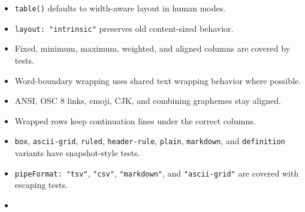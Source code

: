 \begin{itemize}
\tightlist
\item
  \texttt{t\allowbreak{}a\allowbreak{}b\allowbreak{}l\allowbreak{}e\allowbreak{}(\allowbreak{})} defaults to width-aware layout in human modes.
\item
  \texttt{l\allowbreak{}a\allowbreak{}y\allowbreak{}o\allowbreak{}u\allowbreak{}t\allowbreak{}:\allowbreak{} \allowbreak{}"\allowbreak{}i\allowbreak{}n\allowbreak{}t\allowbreak{}r\allowbreak{}i\allowbreak{}n\allowbreak{}s\allowbreak{}i\allowbreak{}c\allowbreak{}"} preserves old content-sized behavior.
\item
  Fixed, minimum, maximum, weighted, and aligned columns are covered by tests.
\item
  Word-boundary wrapping uses shared text wrapping behavior where possible.
\item
  ANSI, OSC 8 links, emoji, CJK, and combining graphemes stay aligned.
\item
  Wrapped rows keep continuation lines under the correct columns.
\item
  \texttt{b\allowbreak{}o\allowbreak{}x}, \texttt{a\allowbreak{}s\allowbreak{}c\allowbreak{}i\allowbreak{}i\allowbreak{}-\allowbreak{}g\allowbreak{}r\allowbreak{}i\allowbreak{}d}, \texttt{r\allowbreak{}u\allowbreak{}l\allowbreak{}e\allowbreak{}d}, \texttt{h\allowbreak{}e\allowbreak{}a\allowbreak{}d\allowbreak{}e\allowbreak{}r\allowbreak{}-\allowbreak{}r\allowbreak{}u\allowbreak{}l\allowbreak{}e}, \texttt{p\allowbreak{}l\allowbreak{}a\allowbreak{}i\allowbreak{}n}, \texttt{m\allowbreak{}a\allowbreak{}r\allowbreak{}k\allowbreak{}d\allowbreak{}o\allowbreak{}w\allowbreak{}n}, and \texttt{d\allowbreak{}e\allowbreak{}f\allowbreak{}i\allowbreak{}n\allowbreak{}i\allowbreak{}t\allowbreak{}i\allowbreak{}o\allowbreak{}n} variants have snapshot-style tests.
\item
  \texttt{p\allowbreak{}i\allowbreak{}p\allowbreak{}e\allowbreak{}F\allowbreak{}o\allowbreak{}r\allowbreak{}m\allowbreak{}a\allowbreak{}t\allowbreak{}:\allowbreak{} \allowbreak{}"\allowbreak{}t\allowbreak{}s\allowbreak{}v\allowbreak{}"}, \texttt{"\allowbreak{}c\allowbreak{}s\allowbreak{}v\allowbreak{}"}, \texttt{"\allowbreak{}m\allowbreak{}a\allowbreak{}r\allowbreak{}k\allowbreak{}d\allowbreak{}o\allowbreak{}w\allowbreak{}n\allowbreak{}"}, and \texttt{"\allowbreak{}a\allowbreak{}s\allowbreak{}c\allowbreak{}i\allowbreak{}i\allowbreak{}-\allowbreak{}g\allowbreak{}r\allowbreak{}i\allowbreak{}d\allowbreak{}"} are covered with escaping tests.
\item

\end{itemize}
